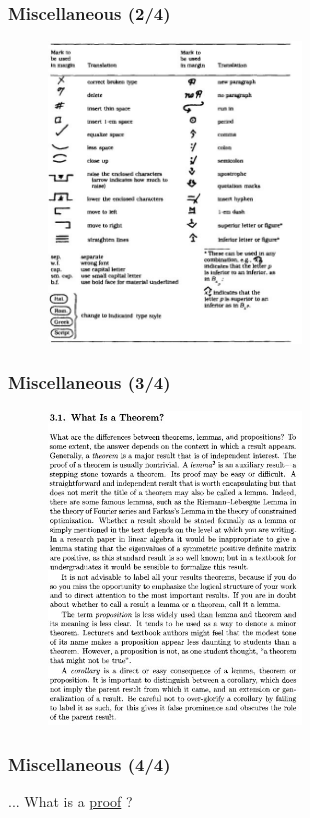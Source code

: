 \documentclass{beamer}
\begin{document}
\begin{frame}
\frametitle{Miscellaneous (2/4)}
\begin{figure}[t]
 \includegraphics[width=0.6\textwidth]{images/correct.jpeg}
\end{figure}
\end{frame}\begin{frame}
\frametitle{Miscellaneous (3/4)}
\begin{figure}[t]
 \includegraphics[width=0.6\textwidth]{images/corr.jpeg}
\end{figure}
\end{frame}
\begin{frame}
\frametitle{Miscellaneous (4/4)}
\begin{center}
... What is a \href{https://www.youtube.com/watch?v=_YgPBmfpLSM}{proof} ?
\end{center}
\end{frame}
\end{document}
